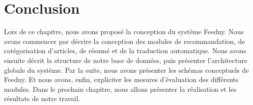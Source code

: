 \section{Conclusion}
Lors de ce chapitre, nous avons proposé la conception du système \textquotedbl Feedny\textquotedbl. Nous avons commencer par décrire la conception des modules de recommandation, de catégorisation d'articles, de résumé et de la traduction automatique. Nous avons ensuite décrit la structure de notre base de données, puis présenter l'architecture globale du système. Par la suite, nous avons présenter les schémas conceptuels de \textquotedbl Feedny\textquotedbl. Et nous avons, enfin, expliciter les mesures d'évaluation des différents modules. Dans le prochain chapitre, nous allons présenter la réalisation et les résultats de notre travail.